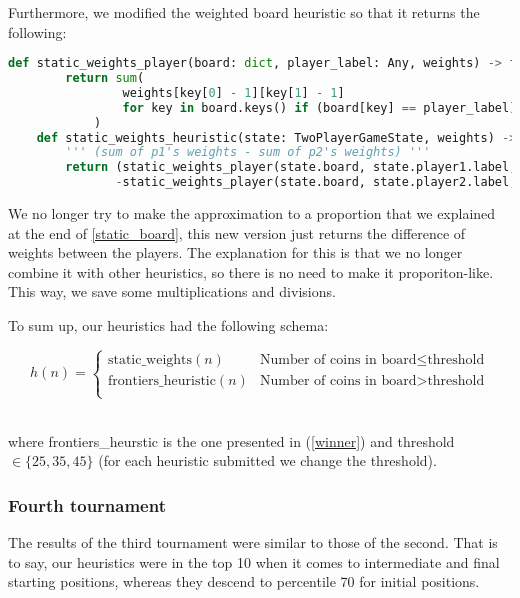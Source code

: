 \documentclass{article}
\begin{document}
\pagebreak

Furthermore, we modified the weighted board heuristic so that it returns the following:

\begin{lstlisting}[language=python, caption = Weighting the board,captionpos=t]
    def static_weights_player(board: dict, player_label: Any, weights) -> float:
        return sum(
                weights[key[0] - 1][key[1] - 1]
                for key in board.keys() if (board[key] == player_label)
            )    
    def static_weights_heuristic(state: TwoPlayerGameState, weights) -> float:
        ''' (sum of p1's weights - sum of p2's weights) '''
        return (static_weights_player(state.board, state.player1.label, weights)      \
               -static_weights_player(state.board, state.player2.label, weights))
\end{lstlisting}

We no longer try to make the approximation to a proportion that we explained at the end of \ref{static_board}, this new version just returns the difference of weights between the players. The explanation for this is that we no longer combine it with other heuristics, so there is no need to make it proporiton-like. This way, we save some multiplications and divisions.

To sum up, our heuristics had the following schema:

\[  h(n)=
    \begin{cases}
        \text{static\_weights}(n) & \text{Number of coins in board}\leq \text{threshold} \\
        \text{frontiers\_heuristic}(n) & \text{Number of coins in board} > \text{threshold} \\
    \end{cases}
\]
\

where frontiers\_heurstic is the one presented in (\ref{winner}) and threshold $\in \{25,35,45\}$ (for each heuristic submitted we change the threshold).

\subsubsection{Fourth tournament}\label{t4}

The results of the third tournament were similar to those of the second. That is to say, our heuristics were in the top 10 when it comes to intermediate and final starting positions, whereas they descend to percentile 70 for initial positions. 
\end{document}
